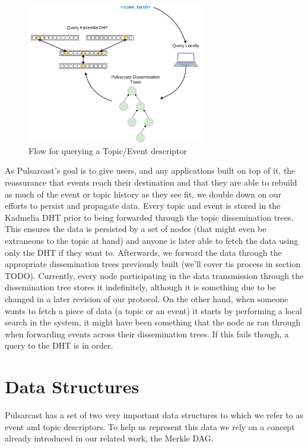 \begin{figure}[hb!]
  \centering
  \includegraphics[width=0.7\textwidth]{img/pulsarcast-descriptor-query.png}
  \caption{Flow for querying a Topic/Event descriptor}
  \label{fig:pulsarcast-descriptor-query}
\end{figure}

As Pulsarcast's goal is to give users, and any applications built on top of it,
the reassurance that events reach their destination and that they are able to
rebuild as much of the event or topic history as they see fit, we double down
on our efforts to persist and propagate data. Every topic and event is stored
in the Kadmelia DHT prior to being forwarded through the topic dissemination
trees. This ensures the data is persisted by a set of nodes (that might even be
extraneous to the topic at hand) and anyone is later able to fetch the data
using only the DHT if they want to. Afterwards, we forward the data through the
appropriate dissemination trees previously built (we'll cover tis process in
section TODO). Currently, every node participating in the data transmission through
the dissemination tree stores it indefinitely, although it is something due to
be changed in a later revision of our protocol. On the other hand, when someone
wants to fetch a piece of data (a topic or an event) it starts by performing a
local search in the system, it might have been something that the node as ran
through when forwarding events across their dissemination trees. If this fails
though, a query to the DHT is in order.

\section{Data Structures}\label{data-structures}

Pulsarcast has a set of two very important data structures to which we refer to
as event and topic descriptors. To help us represent this data we rely on a
concept already introduced in our related work, the Merkle DAG.

